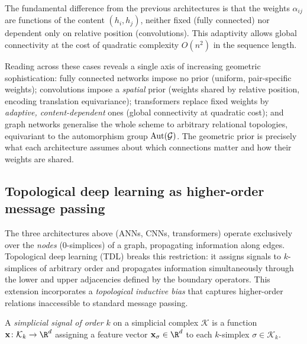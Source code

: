 The fundamental difference from the previous architectures is that the weights
$\alpha_{ij}$ are functions of the content $(h_i, h_j)$, neither fixed (fully
connected) nor dependent only on relative position (convolutions). This
adaptivity allows global connectivity at the cost of quadratic complexity
$O(n^2)$ in the sequence length.

Reading across these cases reveals a single axis of increasing geometric
sophistication: fully connected networks impose no prior (uniform, pair-specific
weights); convolutions impose a \emph{spatial} prior (weights shared by relative
position, encoding translation equivariance); transformers replace fixed weights
by \emph{adaptive, content-dependent} ones (global connectivity at quadratic
cost); and graph networks generalise the whole scheme to arbitrary relational
topologies, equivariant to the automorphism group $\operatorname{Aut}(\mathcal{G})$. The
geometric prior is precisely what each architecture assumes about which
connections matter and how their weights are shared.

\subsection{Topological deep learning as higher-order message passing}
\label{sec:priors:tdl}

The three architectures above (ANNs, CNNs, transformers) operate exclusively
over the \emph{nodes} ($0$-simplices) of a graph, propagating information along
edges. Topological deep learning (TDL) breaks this restriction: it assigns
signals to $k$-simplices of arbitrary order and propagates information
simultaneously through the lower and upper adjacencies defined by the boundary
operators. This extension incorporates a \emph{topological inductive bias} that
captures higher-order relations inaccessible to standard message passing.

\begin{definition}
\label{def:priors:simplicial-signal}
A \emph{simplicial signal of order $k$} on a simplicial complex $\mathcal{K}$ is
a function $\mathbf{x} \colon \mathcal{K}_k \to \R^d$ assigning a feature vector
$\mathbf{x}_\sigma \in \R^d$ to each $k$-simplex $\sigma \in \mathcal{K}_k$.
\end{definition}

